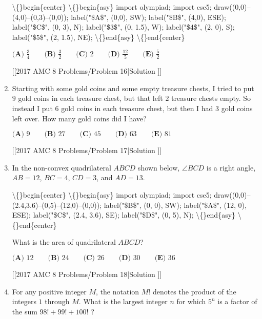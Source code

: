 \documentclass{article}
\begin{document}
\begin{enumerate}[label=\arabic*., itemsep=0.5em]
\textbackslash\{\}begin\{center\}
\textbackslash\{\}begin\{asy\}
import olympiad;
import cse5;
draw((0,0)--(4,0)--(0,3)--(0,0));
label("\$A\$", (0,0), SW);
label("\$B\$", (4,0), ESE);
label("\$C\$", (0, 3), N);
label("\$3\$", (0, 1.5), W);
label("\$4\$", (2, 0), S);
label("\$5\$", (2, 1.5), NE);
\textbackslash\{\}end\{asy\}
\textbackslash\{\}end\{center\}


\(\textbf{(A) }\frac{3}{4}\qquad\textbf{(B) }\frac{3}{2}\qquad\textbf{(C) }2\qquad\textbf{(D) }\frac{12}{5}\qquad\textbf{(E) }\frac{5}{2}\)

[[2017 AMC 8 Problems/Problem 16|Solution
]]\par \vspace{0.5em}\item Starting with some gold coins and some empty treasure chests, I tried to put \(9\) gold coins in each treasure chest, but that left \(2\) treasure chests empty.  So instead I put \(6\) gold coins in each treasure chest, but then I had \(3\) gold coins left over.  How many gold coins did I have?

\(\textbf{(A) }9\qquad\textbf{(B) }27\qquad\textbf{(C) }45\qquad\textbf{(D) }63\qquad\textbf{(E) }81\)

[[2017 AMC 8 Problems/Problem 17|Solution
]]\par \vspace{0.5em}\item In the non-convex quadrilateral \(ABCD\) shown below, \(\angle BCD\) is a right angle, \(AB=12\), \(BC=4\), \(CD=3\), and \(AD=13\).

\textbackslash\{\}begin\{center\}
\textbackslash\{\}begin\{asy\}
import olympiad;
import cse5;
draw((0,0)--(2.4,3.6)--(0,5)--(12,0)--(0,0));
label("\$B\$", (0, 0), SW);
label("\$A\$", (12, 0), ESE);
label("\$C\$", (2.4, 3.6), SE);
label("\$D\$", (0, 5), N);
\textbackslash\{\}end\{asy\}
\textbackslash\{\}end\{center\}

What is the area of quadrilateral \(ABCD\)?

\(\textbf{(A) }12\qquad\textbf{(B) }24\qquad\textbf{(C) }26\qquad\textbf{(D) }30\qquad\textbf{(E) }36\)

[[2017 AMC 8 Problems/Problem 18|Solution
]]\par \vspace{0.5em}\item For any positive integer \(M\), the notation \(M!\) denotes the product of the integers \(1\) through \(M\). What is the largest integer \(n\) for which \(5^n\) is a factor of the sum \(98!+99!+100!\) ?


\end{enumerate}
\end{document}
